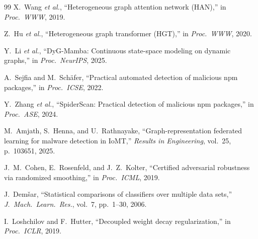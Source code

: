 \documentclass[12pt,a4paper]{article}
\theoremstyle{definition}
\theoremstyle{remark}
\begin{document}
\begin{thebibliography}{99}
X.~Wang \emph{et al.}, ``Heterogeneous graph attention network ({HAN}),'' in \emph{Proc.\ WWW}, 2019.

Z.~Hu \emph{et al.}, ``Heterogeneous graph transformer ({HGT}),'' in \emph{Proc.\ WWW}, 2020.

Y.~Li \emph{et al.}, ``{DyG-Mamba}: Continuous state-space modeling on dynamic graphs,'' in \emph{Proc.\ NeurIPS}, 2025.

A.~Sejfia and M.~Sch\"afer, ``Practical automated detection of malicious {npm} packages,'' in \emph{Proc.\ ICSE}, 2022.

Y.~Zhang \emph{et al.}, ``{SpiderScan}: Practical detection of malicious {npm} packages,'' in \emph{Proc.\ ASE}, 2024.

M.~Amjath, S.~Henna, and U.~Rathnayake, ``Graph-representation federated learning for malware detection in IoMT,'' \emph{Results in Engineering}, vol.~25, p.~103651, 2025.

J.~M.~Cohen, E.~Rosenfeld, and J.~Z.~Kolter, ``Certified adversarial robustness via randomized smoothing,'' in \emph{Proc.\ ICML}, 2019.

J.~Dem\v{s}ar, ``Statistical comparisons of classifiers over multiple data sets,'' \emph{J.\ Mach.\ Learn.\ Res.}, vol.~7, pp.~1--30, 2006.

I.~Loshchilov and F.~Hutter, ``Decoupled weight decay regularization,'' in \emph{Proc.\ ICLR}, 2019.

\end{thebibliography}
\end{document}
